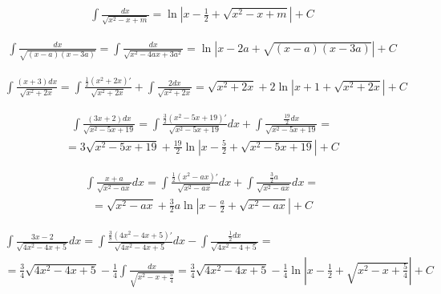 
\begin{gather*}\int \frac{dx}{\sqrt{x^2-x+m}} = \ln|x-\frac{1}{2}+\sqrt{x^2-x+m}|+C\end{gather*}



\begin{gather*}\int \frac{dx}{\sqrt{(x-a)(x-3a)}} = \int \frac{dx}{\sqrt{x^2-4ax+3a^2}} = \ln|x-2a+\sqrt{(x-a)(x-3a)}|+C \end{gather*}



\begin{gather*}\int \frac{(x+3)dx}{\sqrt{x^2+2x}} = \int \frac{\frac{1}{2}(x^2+2x)'}{\sqrt{x^2+2x}}+\int \frac{2dx}{\sqrt{x^2+2x}} = \sqrt{x^2+2x}+2\ln|x+1+\sqrt{x^2+2x}|+C \end{gather*}



\begin{gather*}\int \frac{(3x+2)dx}{\sqrt{x^2-5x+19}} = \int \frac{\frac{3}{2}(x^2-5x+19)'}{\sqrt{x^2-5x+19}}dx + \int \frac{\frac{19}{2}dx}{\sqrt{x^2-5x+19}} = \end{gather*}
\begin{gather*}= 3\sqrt{x^2-5x+19}+\frac{19}{2}\ln|x-\frac{5}{2}+\sqrt{x^2-5x+19}|+C\end{gather*}



\begin{gather*}\int \frac{x+a}{\sqrt{x^2-ax}}dx = \int \frac{\frac{1}{2}(x^2-ax)'}{\sqrt{x^2-ax}}dx+\int \frac{\frac{3}{2}a}{\sqrt{x^2-ax}}dx = \end{gather*}
\begin{gather*}= \sqrt{x^2-ax}+\frac{3}{2}a\ln|x-\frac{a}{2}+\sqrt{x^2-ax}|+C\end{gather*}



\begin{gather*}\int \frac{3x-2}{\sqrt{4x^2-4x+5}}dx = \int \frac{\frac{3}{8}(4x^2-4x+5)'}{\sqrt{4x^2-4x+5}}dx-\int \frac{\frac{1}{2}dx}{\sqrt{4x^2-4+5}} = \\  = \frac{3}{4}\sqrt{4x^2-4x+5}-\frac{1}{4}\int \frac{dx}{\sqrt{x^2-x+\frac{5}{4}}} = \frac{3}{4}\sqrt{4x^2-4x+5}- \frac{1}{4}\ln|x-\frac{1}{2}+\sqrt{x^2-x+\tfrac{5}{4}}|+C \end{gather*}


